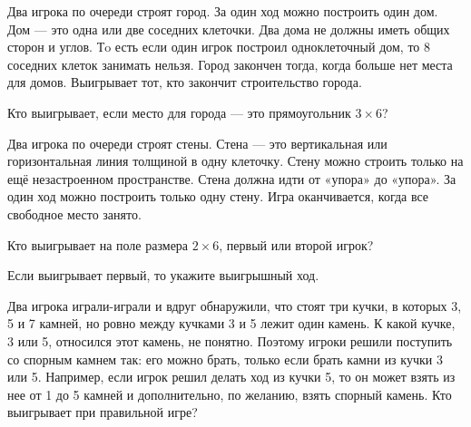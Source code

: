 \begin{problem}

Два игрока по очереди строят город. За один ход можно построить один дом. Дом — это одна или две соседних клеточки. Два дома не должны иметь общих сторон и углов. Тo есть если один игрок построил одноклеточный дом, то 8 соседних клеток занимать нельзя. Город закончен тогда, когда больше нет места для домов. Выигрывает тот, кто закончит строительство города.

Кто выигрывает, если место для города — это прямоугольник $3\times 6$?



\begin{sol}

\end{sol}
\end{problem}




\begin{problem}

Два игрока по очереди строят стены. Стена — это вертикальная или горизонтальная линия толщиной в одну клеточку. Стену можно строить только на ещё незастроенном пространстве. Стена должна идти от «упора» до «упора». За один ход можно построить только одну стену. Игра оканчивается, когда все свободное место занято.

Кто выигрывает на поле размера $2\times 6$, первый или второй игрок?

Если выигрывает первый, то укажите выигрышный ход.



\begin{sol}

\end{sol}
\end{problem}




\begin{problem}

Два игрока играли-играли и вдруг обнаружили, что стоят три кучки, в которых 3, 5 и 7 камней, но ровно между кучками 3 и 5 лежит один камень. К какой кучке, 3 или 5, относился этот камень, не понятно. Поэтому игроки решили поступить со спорным камнем так: его можно брать, только если брать камни из кучки 3 или 5. Например, если игрок решил делать ход из кучки 5, то он может взять из нее от 1 до 5 камней и дополнительно, по желанию, взять спорный камень. Кто выигрывает при правильной игре?



\begin{sol}

\end{sol}
\end{problem}








